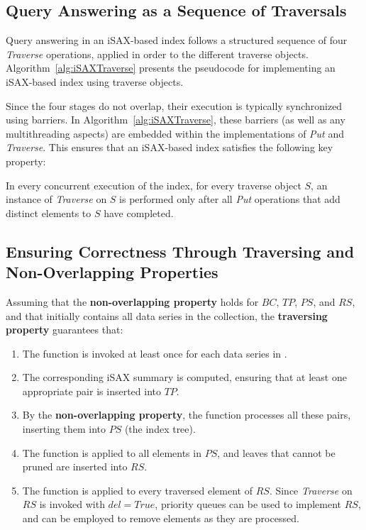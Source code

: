 \subsection{Query Answering as a Sequence of Traversals}

Query answering in an iSAX-based index follows a structured sequence of four
\textit{Traverse} operations, applied in order to the different traverse objects.  
Algorithm~\ref{alg:iSAXTraverse} presents the pseudocode for implementing an iSAX-based index
using traverse objects.

Since the four stages do not overlap, their execution is typically synchronized
using barriers. In Algorithm~\ref{alg:iSAXTraverse}, these barriers (as well as any 
multithreading aspects) are embedded within the implementations of \textit{Put}
and \textit{Traverse}. This ensures that an iSAX-based index satisfies the
following key property:

\begin{definition}
\label{def:non-overlapping}
In every concurrent execution of the index, for every traverse object $S$, an
instance of \textit{Traverse} on $S$ is performed only after all \textit{Put}
operations that add distinct elements to $S$ have completed.
\end{definition}

\subsection{Ensuring Correctness Through Traversing and Non-Overlapping Properties}

Assuming that the \textbf{non-overlapping property} holds for $BC$, $TP$, $PS$,
and $RS$, and that \RawData initially contains all data series in the collection,
the \textbf{traversing property} guarantees that:

\begin{enumerate}
    \item The \BufferCreation function is invoked at least once for each data
     series in \RawData.
    \item The corresponding iSAX summary is computed, ensuring that at least one
     appropriate pair is inserted into $TP$.
    \item By the \textbf{non-overlapping property}, the \TreePopulation function
     processes all these pairs, inserting them into $PS$ (the index tree).
    \item The \Prunning function is applied to all elements in $PS$, and leaves
     that cannot be pruned are inserted into $RS$.
    \item The \Refinement function is applied to every traversed element of $RS$.
     Since \textit{Traverse} on $RS$ is invoked with $del = \mathit{True}$,
    priority queues can be used to implement $RS$, and \DeleteMin can be employed
    to remove elements as they are processed.
\end{enumerate}

